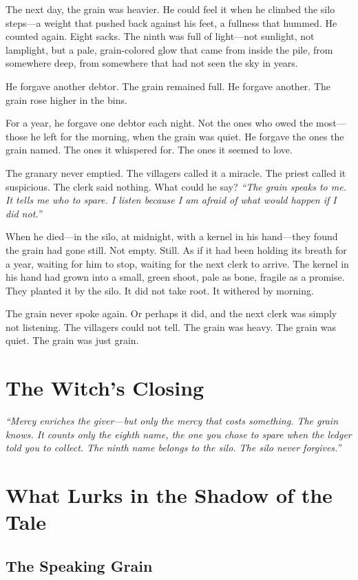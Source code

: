 The next day, the grain was heavier. He could feel it when he climbed the silo steps---a weight that pushed back against his feet, a fullness that hummed. He counted again. Eight sacks. The ninth was full of light---not sunlight, not lamplight, but a pale, grain-colored glow that came from inside the pile, from somewhere deep, from somewhere that had not seen the sky in years.

He forgave another debtor. The grain remained full. He forgave another. The grain rose higher in the bins.

For a year, he forgave one debtor each night. Not the ones who owed the most---those he left for the morning, when the grain was quiet. He forgave the ones the grain named. The ones it whispered for. The ones it seemed to love.

The granary never emptied. The villagers called it a miracle. The priest called it suspicious. The clerk said nothing. What could he say? \textit{``The grain speaks to me. It tells me who to spare. I listen because I am afraid of what would happen if I did not.''}

When he died---in the silo, at midnight, with a kernel in his hand---they found the grain had gone still. Not empty. Still. As if it had been holding its breath for a year, waiting for him to stop, waiting for the next clerk to arrive. The kernel in his hand had grown into a small, green shoot, pale as bone, fragile as a promise. They planted it by the silo. It did not take root. It withered by morning.

The grain never spoke again. Or perhaps it did, and the next clerk was simply not listening. The villagers could not tell. The grain was heavy. The grain was quiet. The grain was just grain.

\section*{The Witch's Closing}
\textit{``Mercy enriches the giver---but only the mercy that costs something. The grain knows. It counts only the eighth name, the one you chose to spare when the ledger told you to collect. The ninth name belongs to the silo. The silo never forgives.''}

\section*{What Lurks in the Shadow of the Tale}

\subsection*{The Speaking Grain}

